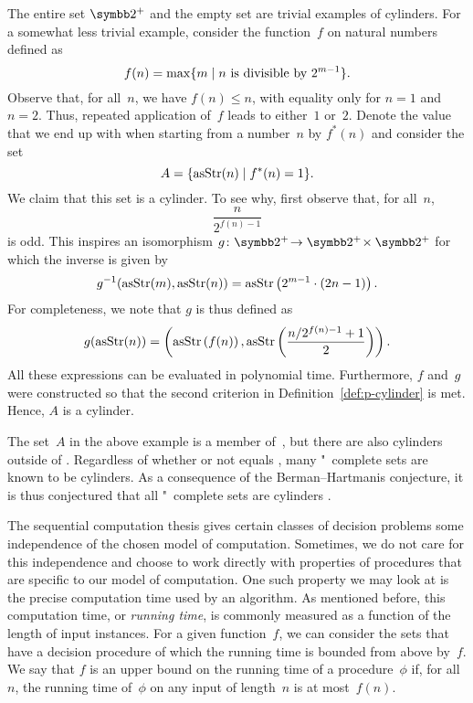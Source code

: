 \begin{example}
  The entire set $\binary^+$ and the empty set are trivial examples of \pdash{}cylinders.
  For a somewhat less trivial example, consider the function~$f$ on natural numbers defined as
  \begin{equation*}
    f(n) = \max \{m \;|\; \text{$n$ is divisible by $2^{m-1}$}\}.
  \end{equation*}
  Observe that, for all~$n$, we have $f(n) \le n$, with equality only for $n = 1$ and $n = 2$.
  Thus, repeated application of~$f$ leads to either~$1$ or~$2$.
  Denote the value that we end up with when starting from a number~$n$ by $f^*(n)$ and consider the set
  \begin{equation*}
    A = \{\operatorname{asStr}(n) \;|\; f^*(n) = 1\}.
  \end{equation*}
  We claim that this set is a \pdash{}cylinder.
  To see why, first observe that, for all~$n$,
  \begin{equation*}
    \frac{n}{2^{f(n) - 1}}
  \end{equation*}
  is odd.
  This inspires an isomorphism $g\colon \binary^+\! \to \binary^+\! \times \binary^+$ for which the inverse is given by
  \begin{equation*}
    g^{-1}(\operatorname{asStr}(m), \operatorname{asStr}(n)) = \operatorname{asStr}\left(2^{m - 1} \cdot (2 n - 1)\right).
  \end{equation*}
  For completeness, we note that $g$ is thus defined as
  \begin{equation*}
    g(\operatorname{asStr}(n)) = \left(\operatorname{asStr}\left(f(n)\right),\operatorname{asStr}\left(\frac{n / 2^{f(n) - 1} + 1}{2}\right)\right).
  \end{equation*}
  All these expressions can be evaluated in polynomial time.
  Furthermore, $f$ and~$g$ were constructed so that the second criterion in Definition~\ref{def:p-cylinder} is met.
  Hence, $A$ is a \pdash{}cylinder.
\end{example}

The set~$A$ in the above example is a member of~, but there are also \pdash{}cylinders outside of  \parencite{allender1988isomorphisms}.
Regardless of whether or not  equals , many "~complete sets are known to be \pdash{}cylinders.
As a consequence of the Berman--Hartmanis conjecture, it is thus conjectured that all "~complete sets are \pdash{}cylinders \parencite[see also][]{hemachandra1991sets}.

The sequential computation thesis gives certain classes of decision problems some independence of the chosen model of computation.
Sometimes, we do not care for this independence and choose to work directly with properties of procedures that are specific to our model of computation.
One such property we may look at is the precise computation time used by an algorithm.
As mentioned before, this computation time, or \emph{running time}, is commonly measured as a function of the length of input instances.
For a given function~$f$, we can consider the sets that have a decision procedure of which the running time is bounded from above by~$f$.
We say that $f$ is an upper bound on the running time of a procedure~$\phi$ if, for all~$n$, the running time of~$\phi$ on any input of length~$n$ is at most~$f(n)$.

